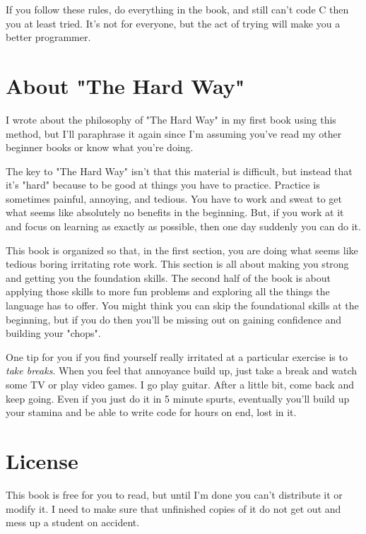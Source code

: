 If you follow these rules, do everything in the book, and still can't
code C then you at least tried.  It's not for everyone, but the act
of trying will make you a better programmer.

\section*{About "The Hard Way"}

I wrote about the philosophy of "The Hard Way" in my first book using
this method, but I'll paraphrase it again since I'm assuming you've
read my other beginner books or know what you're doing.

The key to "The Hard Way" isn't that this material is difficult, but
instead that it's "hard" because to be good at things you have to
practice.  Practice is sometimes painful, annoying, and tedious.  You
have to work and sweat to get what seems like absolutely no benefits
in the beginning.  But, if you work at it and focus on learning as
exactly as possible, then one day suddenly you can do it.

This book is organized so that, in the first section, you are doing
what seems like tedious boring irritating rote work.  This section
is all about making you strong and getting you the foundation skills.
The second half of the book is about applying those skills to more
fun problems and exploring all the things the language has to offer.
You might think you can skip the foundational skills at the beginning,
but if you do then you'll be missing out on gaining confidence and
building your "chops".

One tip for you if you find yourself really irritated at a particular
exercise is to \emph{take breaks}.  When you feel that annoyance build
up, just take a break and watch some TV or play video games.  I go play
guitar.  After a little bit, come back and keep going.  Even if you just
do it in 5 minute spurts, eventually you'll build up your stamina and
be able to write code for hours on end, lost in it.


\section*{License}

This book is free for you to read, but until I'm done you can't distribute it
or modify it.  I need to make sure that unfinished copies of it do not get out
and mess up a student on accident.


